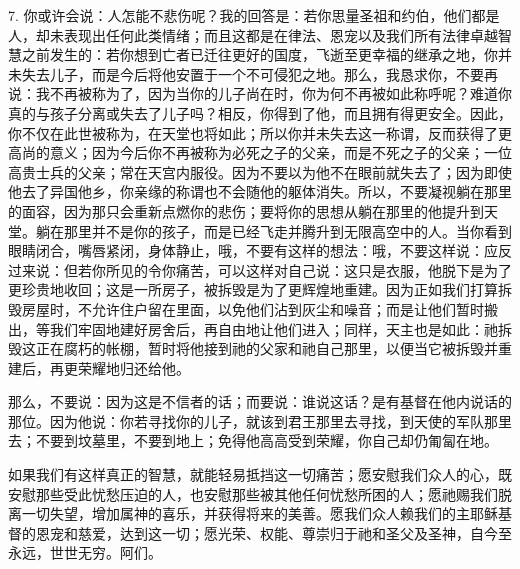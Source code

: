 7. 你或许会说：人怎能不悲伤呢？我的回答是：若你思量圣祖和约伯，他们都是人，却未表现出任何此类情绪；而且这都是在律法、恩宠以及我们所有法律卓越智慧之前发生的：若你想到亡者已迁往更好的国度，飞逝至更幸福的继承之地，你并未失去儿子，而是今后将他安置于一个不可侵犯之地。那么，我恳求你，不要再说：我不再被称为了，因为当你的儿子尚在时，你为何不再被如此称呼呢？难道你真的与孩子分离或失去了儿子吗？相反，你得到了他，而且拥有得更安全。因此，你不仅在此世被称为，在天堂也将如此；所以你并未失去这一称谓，反而获得了更高尚的意义；因为今后你不再被称为必死之子的父亲，而是不死之子的父亲；一位高贵士兵的父亲；常在天宫内服役。因为不要以为他不在眼前就失去了；因为即使他去了异国他乡，你亲缘的称谓也不会随他的躯体消失。所以，不要凝视躺在那里的面容，因为那只会重新点燃你的悲伤；要将你的思想从躺在那里的他提升到天堂。躺在那里并不是你的孩子，而是已经飞走并腾升到无限高空中的人。当你看到眼睛闭合，嘴唇紧闭，身体静止，哦，不要有这样的想法：哦，不要这样说：应反过来说：但若你所见的令你痛苦，可以这样对自己说：这只是衣服，他脱下是为了更珍贵地收回；这是一所房子，被拆毁是为了更辉煌地重建。因为正如我们打算拆毁房屋时，不允许住户留在里面，以免他们沾到灰尘和噪音；而是让他们暂时搬出，等我们牢固地建好房舍后，再自由地让他们进入；同样，天主也是如此：祂拆毁这正在腐朽的帐棚，暂时将他接到祂的父家和祂自己那里，以便当它被拆毁并重建后，再更荣耀地归还给他。\par

那么，不要说：因为这是不信者的话；而要说：谁说这话？是有基督在他内说话的那位。因为他说：你若寻找你的儿子，就该到君王那里去寻找，到天使的军队那里去；不要到坟墓里，不要到地上；免得他高高受到荣耀，你自己却仍匍匐在地。\par

如果我们有这样真正的智慧，就能轻易抵挡这一切痛苦；愿安慰我们众人的心，既安慰那些受此忧愁压迫的人，也安慰那些被其他任何忧愁所困的人；愿祂赐我们脱离一切失望，增加属神的喜乐，并获得将来的美善。愿我们众人赖我们的主耶稣基督的恩宠和慈爱，达到这一切；愿光荣、权能、尊崇归于祂和圣父及圣神，自今至永远，世世无穷。阿们。\par


